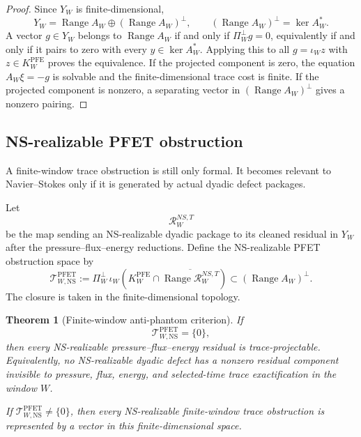 \documentclass[11pt]{article}
\numberwithin{equation}{section}
\theoremstyle{plain}
\newtheorem{theorem}{Theorem}[section]
\theoremstyle{definition}
\theoremstyle{remark}
\newcommand{\NS}{\mathrm{NS}}
\newcommand{\PFE}{\mathrm{PFE}}
\newcommand{\PFET}{\mathrm{PFET}}
\begin{document}
\begin{proof}
Since \(Y_W\) is finite-dimensional,
\[
        Y_W
        =
        \operatorname{Range}A_W
        \oplus
        (\operatorname{Range}A_W)^\perp,
        \qquad
        (\operatorname{Range}A_W)^\perp=\ker A_W^*.
\]
A vector \(g\in Y_W\) belongs to \(\operatorname{Range}A_W\) if and only if
\(\Pi_W^\perp g=0\), equivalently if and only if it pairs to zero with every
\(y\in\ker A_W^*\).  Applying this to all \(g=\iota_Wz\) with
\(z\in K_W^{\PFE}\) proves the equivalence.  If the projected component is zero,
the equation \(A_W\xi=-g\) is solvable and the finite-dimensional trace cost is
finite.  If the projected component is nonzero, a separating vector in
\((\operatorname{Range}A_W)^\perp\) gives a nonzero pairing.
\end{proof}

\subsection{NS-realizable PFET obstruction}

A finite-window trace obstruction is still only formal.  It becomes relevant to
Navier--Stokes only if it is generated by actual dyadic defect packages.

Let
\[
        \mathcal R^{NS,T}_W
\]
be the map sending an NS-realizable dyadic package to its cleaned residual in
\(Y_W\) after the pressure--flux--energy reductions.  Define the NS-realizable
PFET obstruction space by
\begin{equation}
        \mathcal T_{W,\NS}^{\PFET}
        :=
        \Pi_W^\perp\,
        \iota_W
        \left(
          K_W^{\PFE}
          \cap
          \overline{\operatorname{Range}\mathcal R^{NS,T}_W}
        \right)
        \subset (\operatorname{Range}A_W)^\perp .
        \label{eq:ns-pfet-obstruction-space}
\end{equation}
The closure is taken in the finite-dimensional topology.

\begin{theorem}[Finite-window anti-phantom criterion]
\label{thm:finite-window-anti-phantom-clean}
If
\begin{equation}
        \mathcal T_{W,\NS}^{\PFET}=\{0\},
        \label{eq:ns-pfet-zero}
\end{equation}
then every NS-realizable pressure--flux--energy residual is trace-projectable.
Equivalently, no NS-realizable dyadic defect has a nonzero residual component
invisible to pressure, flux, energy, and selected-time trace exactification in
the window \(W\).

If \(\mathcal T_{W,\NS}^{\PFET}\ne\{0\}\), then every NS-realizable
finite-window trace obstruction is represented by a vector in this finite-dimensional
space.
\end{theorem}
\end{document}

